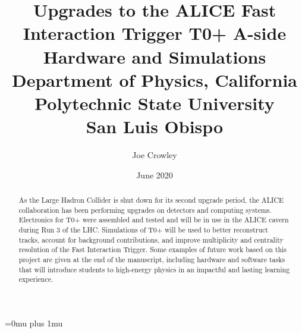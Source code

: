 \documentclass[12pt]{report}
\title{{Upgrades to the ALICE Fast Interaction Trigger T0+ A-side Hardware and Simulations}\\
{\large Department of Physics, California Polytechnic State University}\\
{\large San Luis Obispo}\\
}
\author{Joe Crowley}
\date{June 2020}
\begin{document}
\maketitle
\begin{abstract}
	As the Large Hadron Collider is shut down for its second upgrade period, the ALICE collaboration has been performing upgrades on detectors and computing systems. Electronics for T0+ were assembled and tested and will be in use in the ALICE cavern during Run 3 of the LHC. Simulations of T0+ will be used to better reconstruct tracks, account for background contributions, and improve multiplicity and centrality resolution of the Fast Interaction Trigger. Some examples of future work based on this project are given at the end of the manuscript, including hardware and software tasks that will introduce students to high-energy physics in an impactful and lasting learning experience.
\end{abstract}

\tableofcontents





 
 
\newpage
\Urlmuskip=0mu plus 1mu\relax


\end{document}
